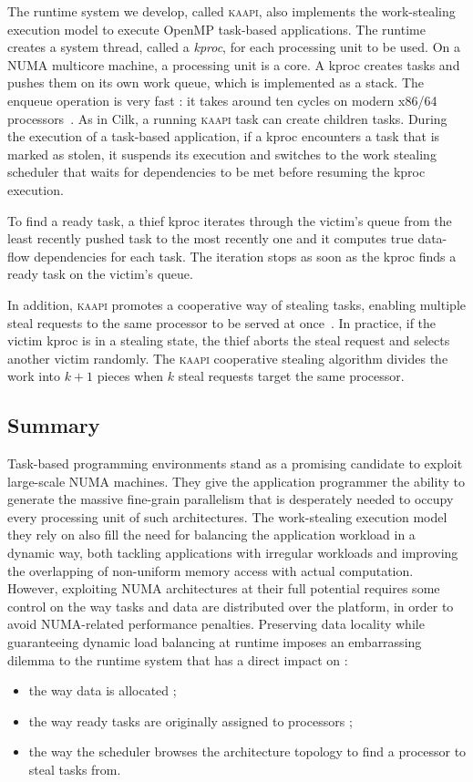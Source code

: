 \documentclass{Styles/llncs}
\newcommand{\kaapi}{\textsc{\mbox{kaapi}}\xspace}
\begin{document}
The runtime system we develop, called \kaapi, also implements the work-stealing execution model to execute OpenMP task-based applications.
The runtime creates a system thread, called a \emph{kproc}, for each processing unit to be used.
On a NUMA multicore machine, a processing unit is a core.
A kproc creates tasks and pushes them on its own work queue, which is implemented as a stack.
The enqueue operation is very fast : it takes around ten cycles on modern x86/64 processors~\cite{libkomp}.
As in Cilk, a  running \kaapi task can create children tasks. 
During the execution of a task-based application, if a kproc encounters a task that is marked as stolen, it suspends its execution and switches to
the work stealing scheduler that waits for dependencies to be met before
resuming the kproc execution. 

To find a ready task, a thief kproc iterates through the victim's queue from
the least recently pushed task to the most recently one and it computes true
data-flow dependencies for each task. 
The iteration stops as soon as the kproc finds a ready task on the victim's queue.

In addition, \kaapi promotes a cooperative way of stealing tasks,
enabling multiple steal requests to the same processor to be served at once~\cite{DBLP:conf/europar/TchiboukdjianDGMR10}.
In practice, if the victim kproc is in a stealing state, the thief aborts the steal request and selects another victim randomly.
The \kaapi cooperative stealing algorithm divides the work into $k+1$ pieces when $k$ steal requests target the same processor.

\subsection{Summary}
Task-based programming environments stand as a promising candidate to exploit large-scale NUMA machines.
They give the application programmer the ability to generate the massive fine-grain parallelism that is desperately needed to occupy every processing unit of such architectures.
The work-stealing execution model they rely on also fill the need for balancing the application workload in a dynamic way, both tackling applications with irregular workloads and improving the overlapping of non-uniform memory access with actual computation.
However, exploiting NUMA architectures at their full potential requires some control on the way tasks and data are distributed over the platform, in order to avoid NUMA-related performance penalties. 
Preserving data locality while guaranteeing dynamic load balancing at runtime imposes an embarrassing dilemma to the runtime system that has a direct impact on :
\begin{itemize}   
\item the way data is allocated ;
\item the way ready tasks are originally assigned to processors ;
\item the way the scheduler browses the architecture topology to find a processor to steal tasks from.
\end{itemize}
\end{document}
